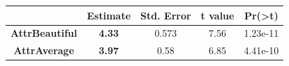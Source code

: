 \documentclass[]{book}
\begin{document}
\begin{longtable}[]{@{}ccccc@{}}
\toprule
\begin{minipage}[b]{0.27\columnwidth}\centering\strut
~\strut
\end{minipage} & \begin{minipage}[b]{0.13\columnwidth}\centering\strut
Estimate\strut
\end{minipage} & \begin{minipage}[b]{0.16\columnwidth}\centering\strut
Std. Error\strut
\end{minipage} & \begin{minipage}[b]{0.12\columnwidth}\centering\strut
t value\strut
\end{minipage} & \begin{minipage}[b]{0.12\columnwidth}\centering\strut
Pr(\textgreater{}\textbar{}t\textbar{})\strut
\end{minipage}\tabularnewline
\midrule
\endhead
\begin{minipage}[t]{0.27\columnwidth}\centering\strut
\textbf{AttrBeautiful}\strut
\end{minipage} & \begin{minipage}[t]{0.13\columnwidth}\centering\strut
\textbf{4.33}\strut
\end{minipage} & \begin{minipage}[t]{0.16\columnwidth}\centering\strut
0.573\strut
\end{minipage} & \begin{minipage}[t]{0.12\columnwidth}\centering\strut
7.56\strut
\end{minipage} & \begin{minipage}[t]{0.12\columnwidth}\centering\strut
1.23e-11\strut
\end{minipage}\tabularnewline
\begin{minipage}[t]{0.27\columnwidth}\centering\strut
\textbf{AttrAverage}\strut
\end{minipage} & \begin{minipage}[t]{0.13\columnwidth}\centering\strut
\textbf{3.97}\strut
\end{minipage} & \begin{minipage}[t]{0.16\columnwidth}\centering\strut
0.58\strut
\end{minipage} & \begin{minipage}[t]{0.12\columnwidth}\centering\strut
6.85\strut
\end{minipage} & \begin{minipage}[t]{0.12\columnwidth}\centering\strut
4.41e-10\strut

\end{minipage}
\end{longtable}
\end{document}
